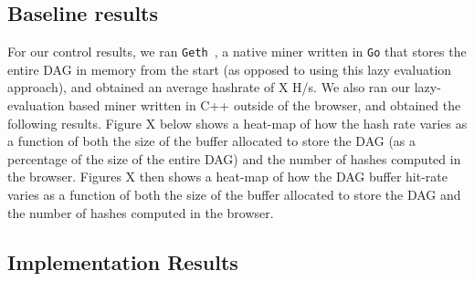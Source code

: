 \documentclass[runningheads]{llncs}
\begin{document}
\subsection{Baseline results}
For our control results, we ran \verb|Geth|~\cite{geth}, a native miner written in \verb|Go| that stores the entire DAG in memory from the start (as opposed to using this lazy evaluation approach), and obtained an average hashrate of X H/s. We also ran our lazy-evaluation based miner written in C++ outside of the browser, and obtained the following results. 
Figure X below shows a heat-map of how the hash rate varies as a function of both the size of the buffer allocated to store the DAG (as a percentage of the size of the entire DAG) and the number of hashes computed in the browser. Figures X then shows a heat-map of how the DAG buffer hit-rate varies as a function of both the size of the buffer allocated to store the DAG and the number of hashes computed in the browser. 



\subsection{Implementation Results}
\end{document}
